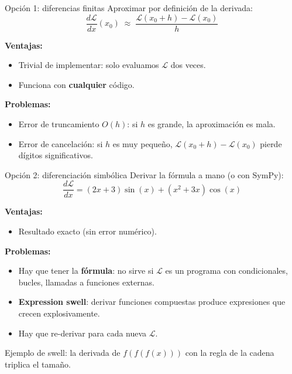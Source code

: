 \documentclass[aspectratio=169,10pt]{beamer}
\begin{document}
\begin{frame}{Opción 1: diferencias finitas}
\vspace{6pt}
Aproximar por definición de la derivada:
\[
\frac{d\mathcal{L}}{dx}(x_0) \;\approx\; \frac{\mathcal{L}(x_0 + h) - \mathcal{L}(x_0)}{h}
\]

\vspace{8pt}
\textbf{Ventajas:}
\begin{itemize}\small
  \item Trivial de implementar: solo evaluamos $\mathcal{L}$ dos veces.
  \item Funciona con \textbf{cualquier} código.
\end{itemize}

\vspace{6pt}
\textbf{Problemas:}
\begin{itemize}\small
  \item Error de truncamiento $O(h)$: si $h$ es grande, la aproximación es mala.
  \item Error de cancelación: si $h$ es muy pequeño, $\mathcal{L}(x_0+h) - \mathcal{L}(x_0)$ pierde dígitos significativos.
\end{itemize}
\end{frame}

\begin{frame}{Opción 2: diferenciación simbólica}
\vspace{6pt}
Derivar la fórmula a mano (o con SymPy):
\[
\frac{d\mathcal{L}}{dx} = (2x+3)\sin(x) + (x^2+3x)\cos(x)
\]

\vspace{8pt}
\textbf{Ventajas:}
\begin{itemize}\small
  \item Resultado exacto (sin error numérico).
\end{itemize}

\vspace{6pt}
\textbf{Problemas:}
\begin{itemize}\small
  \item Hay que tener la \textbf{fórmula}: no sirve si $\mathcal{L}$ es un programa con condicionales, bucles, llamadas a funciones externas.
  \item \textbf{Expression swell}: derivar funciones compuestas produce expresiones que crecen explosivamente.
  \item Hay que re-derivar para cada nueva $\mathcal{L}$.
\end{itemize}

\vspace{6pt}
\textcolor{textgray}{\small Ejemplo de swell: la derivada de $f(f(f(x)))$ con la regla de la cadena triplica el tamaño.}
\end{frame}
\end{document}
